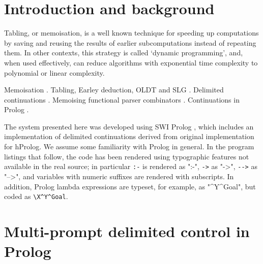 
\section{Introduction and background}

Tabling, or memoisation, is a well known technique for speeding up computations
by saving and reusing the results of earlier subcomputations instead of repeating
them. In other contexts, this strategy is called `dynamic programming', and, when
used effectively, can reduce algorithms with exponential time complexity to polynomial
or linear complexity.

Memoisation
\cite{Michie1968}.
Tabling, Earley deduction, OLDT and SLG
\cite{Earley1970,Warren1975,PereiraWarren1980,Porter1986,TamakiSato1986}.
Delimited continuations \cite{Felleisen1988,DanvyFilinski1990,Filinski1999,Shan2004,KiselyovShan2009,Kiselyov2012}.
Memoising functional parser combinators \cite{Norvig1991,Lindgren1994,Johnson1995}.
Continuations in Prolog \cite{TarauNeumerkel1994,TarauDahl1998,Neumerkel1995,SchrijversDemoenDesouter2013,DesouterVan-DoorenSchrijvers2015}.

The system presented here was developed using SWI Prolog \citep{WielemakerSchrijversTriska2012},
which includes an implementation of delimited continuations
derived from  original implementation for hProlog.
We assume some familiarity with Prolog in general. In the program listings that follow, the code
has been rendered using typographic features not available in the real source; in particular
\verb|:-| is rendered as ":-", \verb|->| as "->", \verb|-->| as "-->", and variables with numeric suffixes
are rendered with subscripts. In addition, Prolog lambda expressions \citep{Neumerkel2009} are typeset, for example,
as "\X^Y^Goal", but coded as \verb|\X^Y^Goal|.

\section{Multi-prompt delimited control in Prolog}

